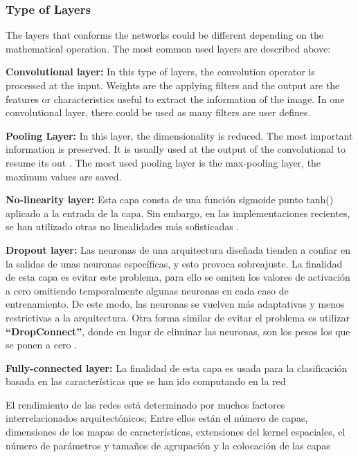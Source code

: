\subsubsection{Type of Layers}
The layers that conforms the networks could be different depending on the mathematical operation. The most common used layers are described above:
\begin{description}[noitemsep,topsep=8pt,parsep=0pt,partopsep=20pt]
	\item \textbf{Convolutional layer:} In this type of layers, the convolution operator is processed at the input. Weights are the applying filters and the output are the features or characteristics useful to extract the information of the image. In one convolutional layer, there could be used as many filters are user defines.
	\item \textbf{Pooling Layer:} In this layer, the dimensionality is reduced. The most important information is preserved. It is usually used at the output of the convolutional to resume its out \cite{Doorn}. The most used pooling layer is the max-pooling layer, the maximum values are saved.
	\item \textbf{No-linearity layer: } Esta capa consta de una función sigmoide punto tanh() aplicado a la entrada de la capa. Sin embargo, en las implementaciones recientes, se han utilizado otras no linealidades más sofisticadas \cite{Lecum3, Doorn}.
	\item \textbf{Dropout layer:} Las neuronas de una arquitectura diseñada tienden a confiar en la salidas de unas neuronas específicas, y esto provoca sobreajuste. La finalidad de esta capa es evitar este problema, para ello se omiten los valores de activación a cero omitiendo temporalmente algunas neuronas en cada caso de entrenamiento. De este modo, las neuronas se vuelven más adaptativas y menos restrictivas a la arquitectura. Otra forma similar de evitar el problema es utilizar \textbf{``DropConnect''}, donde en lugar de eliminar las neuronas, son los pesos los que se ponen a cero \cite{Doorn}.\\
	\item  \textbf{Fully-connected layer:} La finalidad de esta capa es usada para la clasificación basada en las características que se han ido computando en la red %
\end{description}

El rendimiento de las redes está determinado por muchos factores interrelacionados arquitectónicos; Entre ellos están el número de capas, dimensiones de los mapas de características, extensiones del kernel espaciales, el número de parámetros y tamaños de agrupación y la colocación de las capas %


